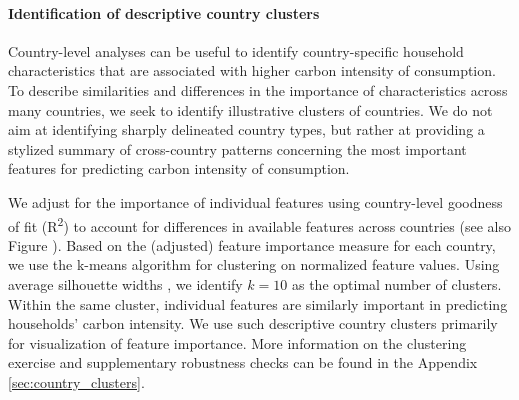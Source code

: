 \documentclass[12pt, a4paper]{article}
\begin{document}


\paragraph{Identification of descriptive country clusters} Country-level analyses can be useful to identify country-specific household characteristics that are associated with higher carbon intensity of consumption. To describe similarities and differences in the importance of characteristics across many countries, we seek to identify illustrative clusters of countries. We do not aim at identifying sharply delineated country types, but rather at providing a stylized summary of cross-country patterns concerning the most important features for predicting carbon intensity of consumption.

We adjust for the importance of individual features using country-level goodness of fit (R\textsuperscript{2}) to account for differences in available features across countries (see also Figure ). Based on the (adjusted) feature importance measure for each country, we use the k-means algorithm \autocite{MacQueen.1967} for clustering on normalized feature values. Using average silhouette widths \autocite{Rousseeuw.1987}, we identify $k=10$ as the optimal number of clusters. Within the same cluster, individual features are similarly important in predicting households' carbon intensity. We use such descriptive country clusters primarily for visualization of feature importance. More information on the clustering exercise and supplementary robustness checks can be found in the Appendix \ref{sec:country_clusters}. 
\end{document}
